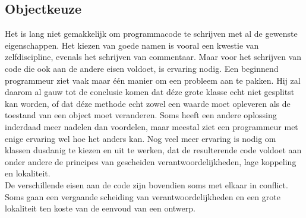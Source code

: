 \documentclass{article}
\begin{document}
	\subsection{Objectkeuze}
	
	Het is lang niet gemakkelijk om programmacode te schrijven met al de
	gewenste eigenschappen. Het kiezen van goede namen is vooral een
	kwestie van zelfdiscipline, evenals het schrijven van commentaar. Maar
	voor het schrijven van code die ook aan de andere eisen voldoet, is
	ervaring nodig. Een beginnend programmeur ziet vaak maar één manier
	om een probleem aan te pakken. Hij zal daarom al gauw tot de conclusie
	komen dat déze grote klasse echt niet gesplitst kan worden, of dat déze
	methode echt zowel een waarde moet opleveren als de toestand van een
	object moet veranderen. Soms heeft een andere oplossing inderdaad
	meer nadelen dan voordelen, maar meestal ziet een programmeur met
	enige ervaring wel hoe het anders kan. Nog veel meer ervaring is nodig
	om klassen dusdanig te kiezen en uit te werken, dat de resulterende code
	voldoet aan onder andere de principes van gescheiden
	verantwoordelijkheden, lage koppeling en lokaliteit. \\
	De verschillende eisen aan de code zijn bovendien soms met elkaar in
	conflict. Soms gaan een vergaande scheiding van verantwoordelijkheden
	en een grote lokaliteit ten koste van de eenvoud van een ontwerp.
	
\end{document}
